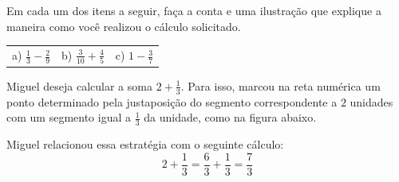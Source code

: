 \begin{atividade}{}

Em cada um dos itens a seguir, faça a conta e uma ilustração que explique a maneira como você realizou o cálculo solicitado.

\begin{center}
  \begin{tabular}{m{}m{}m{}}
     a) $\frac{1}{3} - \frac{2}{9}$  &   b) $\frac{3}{10} + \frac{4}{5}$  &   c) $1 - \frac{3}{7}$
  \end{tabular}
\end{center}
\end{atividade}

\begin{atividade}{}
Miguel deseja calcular a soma $2 + \frac{1}{3}$. Para isso, marcou na reta numérica um ponto determinado pela justaposição do segmento correspondente a $2$ unidades com um segmento igual a $\frac{1}{3}$ da unidade, como na figura abaixo.

Miguel relacionou essa estratégia com o seguinte cálculo:
$$ 2 + \frac{1}{3} =  \frac{6}{3} + \frac{1}{3} = \frac{7}{3}$$

%


\begin{center}
\end{center}
\end{atividade}
